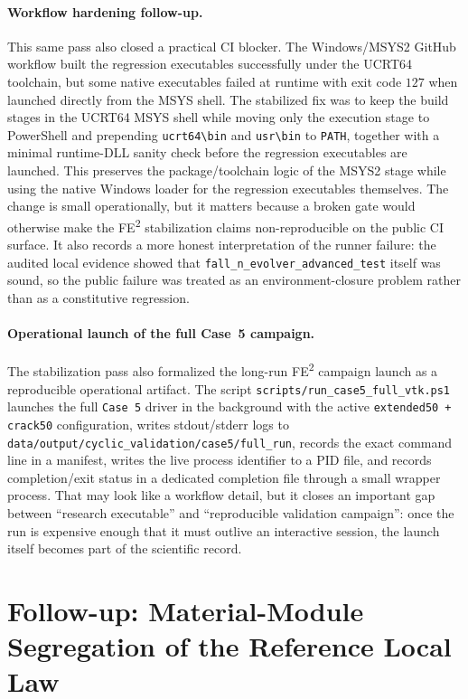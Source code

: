 \paragraph{Workflow hardening follow-up.}
This same pass also closed a practical CI blocker.  The Windows/MSYS2 GitHub
workflow built the regression executables successfully under the UCRT64 toolchain,
but some native executables failed at runtime with exit code \(127\) when
launched directly from the MSYS shell.  The stabilized fix was to keep the
build stages in the UCRT64 MSYS shell while moving only the execution stage to
PowerShell and prepending \texttt{ucrt64\textbackslash bin} and
\texttt{usr\textbackslash bin} to \texttt{PATH}, together with a minimal
runtime-DLL sanity check before the regression executables are launched.  This
preserves the package/toolchain logic of the MSYS2 stage while using the
native Windows loader for the regression executables themselves.  The change is
small operationally, but it matters because a broken gate would otherwise make
the FE\textsuperscript{2} stabilization claims non-reproducible on the public
CI surface.  It also records a more honest interpretation of the runner failure:
the audited local evidence showed that \texttt{fall\_n\_evolver\_advanced\_test}
itself was sound, so the public failure was treated as an environment-closure
problem rather than as a constitutive regression.

\paragraph{Operational launch of the full Case~5 campaign.}
The stabilization pass also formalized the long-run FE\textsuperscript{2}
campaign launch as a reproducible operational artifact.  The script
\texttt{scripts/run\_case5\_full\_vtk.ps1} launches the full
\texttt{Case~5} driver in the background with the active
\texttt{extended50 + crack50} configuration, writes stdout/stderr logs to
\texttt{data/output/cyclic\_validation/case5/full\_run}, records the exact
command line in a manifest, writes the live process identifier to a PID file,
and records completion/exit status in a dedicated completion file through a
small wrapper process.  That may look like a workflow detail, but it closes an
important gap between ``research executable'' and ``reproducible validation
campaign'': once the run is expensive enough that it must outlive an
interactive session, the launch itself becomes part of the scientific record.

\section{Follow-up: Material-Module Segregation of the Reference Local Law}
\label{sec:ms-stab-material-segregation}

